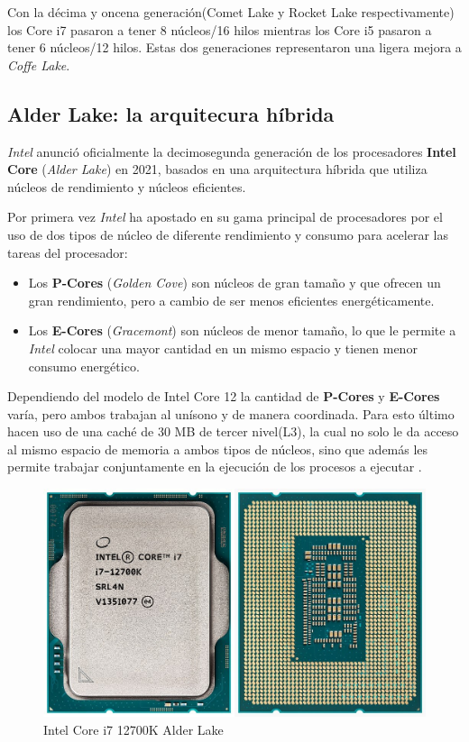 Con la décima y oncena generación(Comet Lake y Rocket Lake respectivamente)  los Core i7 pasaron a tener 8 núcleos/16 hilos mientras los Core i5  
pasaron a tener 6 núcleos/12 hilos. Estas dos generaciones representaron una ligera mejora a \emph{Coffe Lake}.

\subsection{Alder Lake: la arquitecura híbrida}

\emph{Intel} anunció oficialmente la decimosegunda generación de los procesadores \textbf{Intel Core} (\emph{Alder Lake}) en 2021, 
basados en una arquitectura híbrida que utiliza núcleos de rendimiento  y núcleos eficientes.

Por primera vez \emph{Intel} ha apostado en su gama principal de procesadores por el uso de dos tipos de núcleo de diferente 
rendimiento y consumo para acelerar las tareas del procesador:

\begin{itemize}
	\item Los \textbf{P-Cores} (\emph{Golden Cove}) son núcleos de gran tamaño y que ofrecen un gran rendimiento, pero a cambio de ser menos eficientes energéticamente.
	\item Los \textbf{E-Cores} (\emph{Gracemont}) son núcleos de menor tamaño, lo que le permite a \emph{Intel} colocar una mayor cantidad en un mismo espacio y 
	tienen menor consumo energético.
\end{itemize}


Dependiendo del modelo de Intel Core 12 la cantidad de \textbf{P-Cores} y \textbf{E-Cores} varía, pero ambos trabajan al unísono y de manera coordinada. 
Para esto último hacen uso de una caché de 30 MB de tercer nivel(L3), la cual no solo le da acceso al mismo espacio de memoria 
a ambos tipos de núcleos, sino que además les permite trabajar conjuntamente en la ejecución de los procesos a ejecutar .

\begin{figure}[htb]
	\centering
	\includegraphics[scale = 0.2]{Graphics/Intel_CPU_Core_i7_12700K_Alder_Lake.jpg}
	\caption{Intel Core i7 12700K Alder Lake}
	\label{fig:26}
\end{figure}

